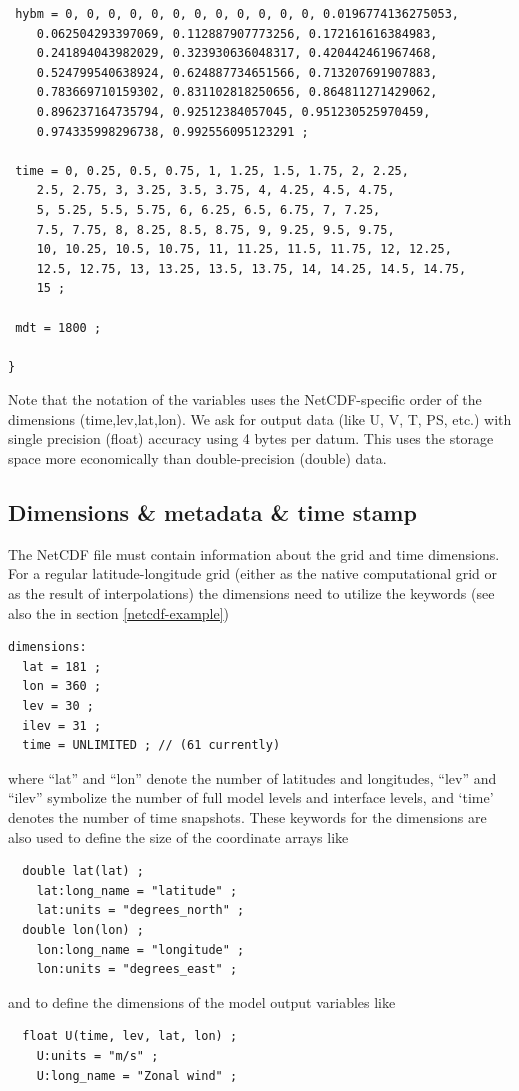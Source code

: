 \documentclass[times,doublespace]{fldauth}
\begin{document}
{\begin{appendix}
\begin{verbatim}
 hybm = 0, 0, 0, 0, 0, 0, 0, 0, 0, 0, 0, 0, 0.0196774136275053, 
    0.062504293397069, 0.112887907773256, 0.172161616384983, 
    0.241894043982029, 0.323930636048317, 0.420442461967468, 
    0.524799540638924, 0.624887734651566, 0.713207691907883, 
    0.783669710159302, 0.831102818250656, 0.864811271429062, 
    0.896237164735794, 0.92512384057045, 0.951230525970459, 
    0.974335998296738, 0.992556095123291 ;

 time = 0, 0.25, 0.5, 0.75, 1, 1.25, 1.5, 1.75, 2, 2.25,
    2.5, 2.75, 3, 3.25, 3.5, 3.75, 4, 4.25, 4.5, 4.75,
    5, 5.25, 5.5, 5.75, 6, 6.25, 6.5, 6.75, 7, 7.25,
    7.5, 7.75, 8, 8.25, 8.5, 8.75, 9, 9.25, 9.5, 9.75,
    10, 10.25, 10.5, 10.75, 11, 11.25, 11.5, 11.75, 12, 12.25, 
    12.5, 12.75, 13, 13.25, 13.5, 13.75, 14, 14.25, 14.5, 14.75, 
    15 ;
 
 mdt = 1800 ;

}
\end{verbatim}
Note that the notation of the variables uses the NetCDF-specific order of the dimensions (time,lev,lat,lon). We ask for output data (like U, V, T, PS, etc.) with single precision (float) accuracy using 4 bytes per datum. This uses the storage space more economically than double-precision (double) data. 

\subsection{Dimensions \& metadata \& time stamp}
The NetCDF file must contain information about the grid and time dimensions. For a regular latitude-longitude grid (either as the native computational grid or as the result of interpolations) the dimensions need to utilize the keywords (see also the in section \ref{netcdf-example})
\begin{verbatim}
dimensions:
  lat = 181 ;
  lon = 360 ;
  lev = 30 ;
  ilev = 31 ;
  time = UNLIMITED ; // (61 currently)
\end{verbatim}
where ``lat'' and ``lon'' denote the number of latitudes and longitudes, ``lev'' and ``ilev'' symbolize the number of full model levels and interface levels, and `time' denotes the number of time snapshots. These keywords for the dimensions are also used to define the size of the coordinate arrays like
\begin{verbatim}
  double lat(lat) ;
    lat:long_name = "latitude" ;
    lat:units = "degrees_north" ;
  double lon(lon) ;
    lon:long_name = "longitude" ;
    lon:units = "degrees_east" ;
\end{verbatim}
and to define the dimensions of the model output variables like
\begin{verbatim}
  float U(time, lev, lat, lon) ;
    U:units = "m/s" ;
    U:long_name = "Zonal wind" ;
\end{verbatim}


\end{appendix}}
\end{document}
